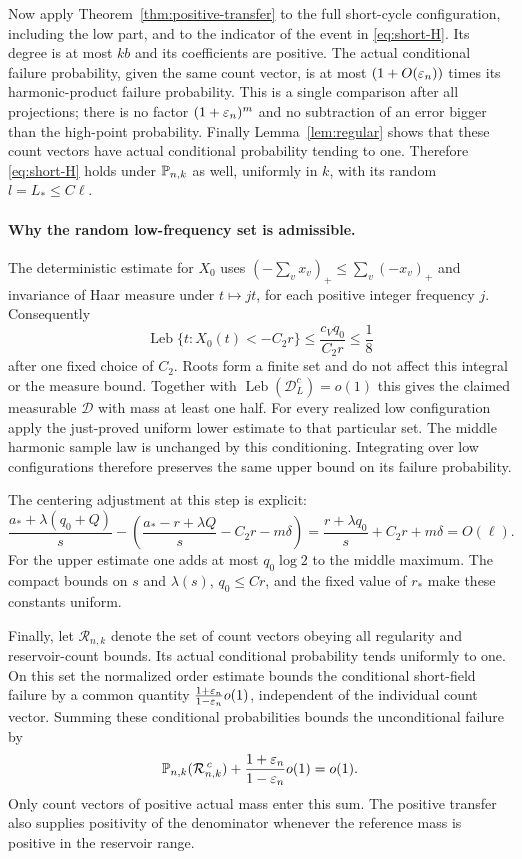 \documentclass[11pt]{article}
\theoremstyle{definition}\newtheorem{definition}[theorem]{Definition}
\theoremstyle{remark}\newtheorem{remark}[theorem]{Remark}
\newcommand{\Leb}{\operatorname{Leb}}\newcommand{\TV}{\operatorname{TV}}
\numberwithin{equation}{section}\allowdisplaybreaks
\begin{document}
Now apply Theorem~\ref{thm:positive-transfer} to the full short-cycle
configuration, including the low part, and to the indicator of the event
in \eqref{eq:short-H}. Its degree is at most $kb$ and its coefficients
are positive. The actual conditional failure probability, given the same
count vector, is at most $(1+O(\varepsilon_n))$ times its harmonic-product
failure probability. This is a single comparison after all projections;
there is no factor $(1+\varepsilon_n)^m$ and no subtraction of an error bigger
than the high-point probability. Finally Lemma~\ref{lem:regular} shows
that these count vectors have actual conditional probability tending to
one. Therefore \eqref{eq:short-H} holds under $\mathbb P_{n,k}$ as well,
uniformly in $k$, with its random $l=L_*\le C\ell$.

\paragraph{Why the random low-frequency set is admissible.}
The deterministic estimate for $X_0$ uses
$(-\sum_vx_v)_+\le\sum_v(-x_v)_+$ and invariance of Haar
measure under $t\mapsto jt$, for each positive integer
frequency $j$. Consequently
\[
 \Leb\{t:X_0(t)<-C_2r\}\le\frac{c_Vq_0}{C_2r}\le\frac18
\]
after one fixed choice of $C_2$. Roots form a finite set
and do not affect this integral or the measure bound.
Together with $\Leb(\mathcal D_L^c)=o(1)$ this gives the
claimed measurable $\mathcal D$ with mass at least one half.
For every realized low configuration apply the just-proved
uniform lower estimate to that particular set. The middle
harmonic sample law is unchanged by this conditioning.
Integrating over low configurations therefore preserves
the same upper bound on its failure probability.

The centering adjustment at this step is explicit:
\[
 \frac{a_*+\lambda(q_0+Q)}s
       -\left(\frac{a_*-r+\lambda Q}s-C_2r-m\delta\right)
 =\frac{r+\lambda q_0}s+C_2r+m\delta=O(\ell).
\]
For the upper estimate one adds at most $q_0\log2$
to the middle maximum. The compact bounds on $s$ and
$\lambda(s)$, $q_0\le Cr$, and the fixed value of $r_*$
make these constants uniform.

Finally, let $\mathcal R_{n,k}$ denote the set of count
vectors obeying all regularity and reservoir-count bounds.
Its actual conditional probability tends uniformly to one.
On this set the normalized order estimate bounds the
conditional short-field failure by a common quantity
$\frac{1+\varepsilon_n}{1-\varepsilon_n}o(1)$, independent of the
individual count vector. Summing these conditional
probabilities bounds the unconditional failure by
\[
 \mathbb P_{n,k}(\mathcal R_{n,k}^{\,c})
       +\frac{1+\varepsilon_n}{1-\varepsilon_n}o(1)=o(1).
\]
Only count vectors of positive actual mass enter this
sum. The positive transfer also supplies positivity
of the denominator whenever the reference mass is
positive in the reservoir range.
\end{document}
